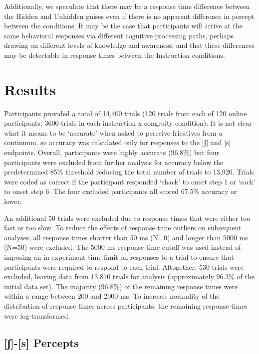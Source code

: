 \documentclass[
  letterpaper,
  DIV=11,
  numbers=noendperiod]{scrartcl}
\begin{document}
Additionally, we speculate that there may be a response time difference
between the Hidden and Unhidden guises even if there is no apparent
difference in percept between the conditions. It may be the case that
participants will arrive at the same behavioral responses via different
cognitive processing paths, perhaps drawing on different levels of
knowledge and awareness, and that these differences may be detectable in
response times between the Instruction conditions.

\section{Results}\label{sec-results}

Participants provided a total of 14,400 trials (120 trials from each of
120 online participants; 3600 trials in each instruction x congruity
condition). It is not clear what it means to be `accurate' when asked to
perceive fricatives from a continuum, so accuracy was calculated only
for responses to the {[}ʃ{]} and {[}s{]} endpoints. Overall,
participants were highly accurate (96.8\%) but four participants were
excluded from further analysis for accuracy below the predetermined 85\%
threshold reducing the total number of trials to 13,920. Trials were
coded as correct if the participant responded `shack' to onset step 1 or
`sack' to onset step 6. The four excluded participants all scored 67.5\%
accuracy or lower.

An additional 50 trials were excluded due to response times that were
either too fast or too slow. To reduce the effects of response time
outliers on subsequent analyses, all response times shorter than 50 ms
(N=0) and longer than 5000 ms (N=50) were excluded. The 5000 ms response
time cutoff was used instead of imposing an in-experiment time limit on
responses to a trial to ensure that participants were required to
respond to each trial. Altogether, 530 trials were excluded, leaving
data from 13,870 trials for analysis (approximately 96.3\% of the
initial data set). The majority (96.8\%) of the remaining response times
were within a range between 200 and 2000 ms. To increase normality of
the distribution of response times across participants, the remaining
response times were log-transformed.

\subsection{{[}ʃ{]}-{[}s{]} Percepts}\label{sec-results-fricative}
\end{document}

